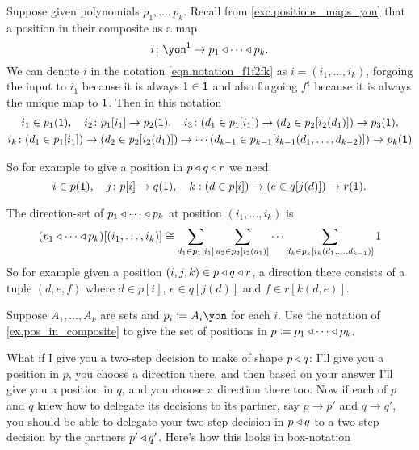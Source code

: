 \documentclass[DynamicalBook]{subfiles}
\begin{document}
\begin{example}\label{ex.pos_in_composite}
Suppose given polynomials $p_1,\ldots,p_k$. Recall from \cref{exc.positions_maps_yon} that a position in their composite as a map
\[
i\colon \yon^\1\to p_1\tri\cdots\tri p_k.
\]
We can denote $i$ in the notation \eqref{eqn.notation_f1f2fk} as $i=(i_1,\ldots,i_k)$, forgoing the input to $i_1$ because it is always $1\in\textsf{1}$ and also forgoing $f^\sharp$ because it is always the unique map to $\textsf{1}$. Then in this notation 
\begin{gather*}
i_1\in p_1(\textsf{1}),\quad
i_2\colon p_1[i_1]\to p_2(\textsf{1}),\quad
i_3\colon (d_1\in p_1[i_1])\to(d_2\in p_2[i_2(d_1)])\to p_3(\textsf{1}),\\
i_k\colon(d_1\in p_1[i_1])\to(d_2\in p_2[i_2(d_1)])\to\cdots(d_{k-1}\in p_{k-1}[i_{k-1}(d_1,\ldots,d_{k-2})])\to p_k(\textsf{1})
\end{gather*}

So for example to give a position in $p\mathbin{\triangleleft} q\mathbin{\triangleleft} r$ we need 
\[
i\in p(\textsf{1}),\quad
j\colon p[i]\to q(\textsf{1}),\quad
k:(d\in p[i])\to(e\in q[j(d)])\to r(\textsf{1}).
\]

The direction-set of $p_1\mathbin{\triangleleft}\cdots\mathbin{\triangleleft} p_k$ at position $(i_1,\ldots,i_k)$ is 
\[
(p_1\mathbin{\triangleleft}\cdots\mathbin{\triangleleft} p_k)[(i_1,\ldots,i_k)]\cong\sum_{d_1\in p_1[i_1]}\sum_{d_2\in p_2[i_2(d_1)]}\cdots\sum_{d_k\in p_k[i_k(d_1,\ldots,d_{k-1})]}\textsf{1}
\]
So for example given a position $(i,j,k)\in p\mathbin{\triangleleft} q\mathbin{\triangleleft} r$, a direction there consists of a tuple $(d,e,f)$ where $d\in p[i]$, $e\in q[j(d)]$ and $f\in r[k(d,e)]$.
\end{example}

\begin{exercise}
Suppose $A_1,\ldots,A_k$ are sets and $p_i\coloneqq A_i\yon$ for each $i$. Use the notation of \cref{ex.pos_in_composite} to give the set of positions in $p\coloneqq p_1\mathbin{\triangleleft}\cdots\mathbin{\triangleleft} p_k$.
\end{exercise}

What if I give you a two-step decision to make of shape $p\mathbin{\triangleleft} q$: I'll give you a position in $p$, you choose a direction there, and then based on your answer I'll give you a position in $q$, and you choose a direction there too. Now if each of $p$ and $q$ knew how to delegate its decisions to its partner, say $p\to p'$ and $q\to q'$, you should be able to delegate your two-step decision in $p\mathbin{\triangleleft} q$ to a two-step decision by the partners $p'\mathbin{\triangleleft} q'$. Here's how this looks in box-notation
\end{document}
